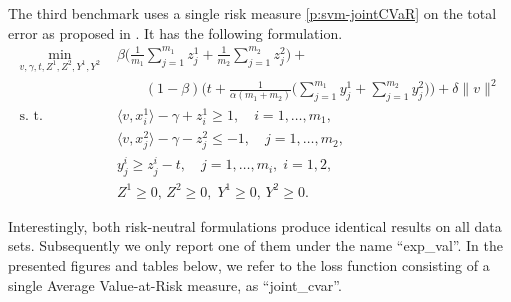 \documentclass[10pt,letterpaper]{article}
\newcommand{\1}{1{\hskip -2.55 pt}\hbox{I}}
\begin{document}
The third benchmark uses a single risk measure \eqref{p:svm-jointCVaR} on the total error as proposed in \cite{gotoh2017support}. It has the following formulation.
\begin{equation}
\label{p:svm-jointCVaR}
\begin{aligned}
\min_{v,\gamma,t,Z^1,Z^2, Y^1,Y^2}\ &\,
 \beta\Big( \frac{1}{m_1}\sum_{j=1}^{m_1} z^1_j + \frac{1}{m_2}\sum_{j=1}^{m_2} z^2_j \Big) + \\
 &\,\qquad(1-\beta)\bigg( t + \frac{1}{\alpha(m_1+m_2)}\Big( \sum_{j=1}^{m_1} y^1_j + \sum_{j=1}^{m_2} y^2_j \Big) \bigg) +\delta\|v\|^2\\
\text{s. t. } &\, \langle v, x^1_i\rangle - \gamma + z_i^1 \ge 1, \quad i=1,\dots,m_1,\\
&\, \langle v, x^2_{j}\rangle -\gamma  - z_{j}^2 \le -1, \quad j=1,\dots,m_2,\\
&\, y_j^i\geq z_j^i-t,\quad j=1,\dots,m_i,\; i=1,2,\\
&\, Z^1\ge 0,\, Z^2\geq 0,\; Y^1\ge 0,\, Y^2\geq 0.
\end{aligned}
\end{equation}


Interestingly, both risk-neutral formulations produce identical results on all data sets.
Subsequently we only report one of them under the name ``exp\_val''. 
In the presented figures and tables below, we refer to the loss function consisting of a single Average Value-at-Risk measure, as ``joint\_cvar''.
\end{document}

